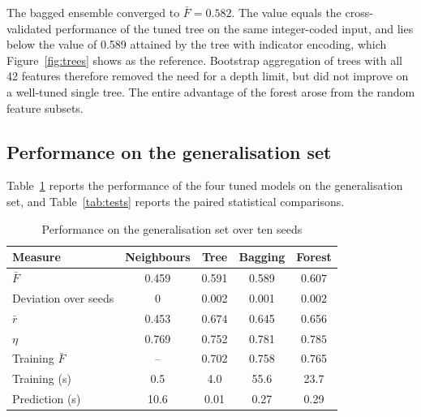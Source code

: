 The bagged ensemble converged to $\bar{F} = 0.582$. The value equals the
cross-validated performance of the tuned tree on the same integer-coded
input, and lies below the value of 0.589 attained by the tree with indicator
encoding, which Figure~\ref{fig:trees} shows as the reference. Bootstrap
aggregation of trees with all 42 features therefore removed the need for a
depth limit, but did not improve on a well-tuned single tree. The entire advantage of the
forest arose from the random feature subsets.

\subsection{Performance on the generalisation set}
\label{sec:res-general}

Table~\ref{tab:final} reports the performance of the four tuned models on the
generalisation set, and Table~\ref{tab:tests} reports the paired statistical
comparisons.

\begin{table}[!t]
\centering
\caption{Performance on the generalisation set over ten seeds}
\label{tab:final}
\setlength{\tabcolsep}{3.5pt}
\begin{tabular}{@{}lcccc@{}}
\toprule
\textbf{Measure} & \textbf{Neighbours} & \textbf{Tree} & \textbf{Bagging} & \textbf{Forest} \\
\midrule
$\bar{F}$          & 0.459 & 0.591 & 0.589 & $\mathbf{0.607}$ \\
Deviation over seeds & 0 & 0.002 & 0.001 & 0.002 \\
$\bar{r}$          & 0.453 & $\mathbf{0.674}$ & 0.645 & 0.656 \\
$\eta$             & 0.769 & 0.752 & 0.781 & $\mathbf{0.785}$ \\
Training $\bar{F}$ & --    & 0.702 & 0.758 & 0.765 \\
Training (s)       & 0.5   & 4.0   & 55.6  & 23.7 \\
Prediction (s)     & 10.6  & 0.01  & 0.27  & 0.29 \\
\bottomrule
\end{tabular}
\end{table}

